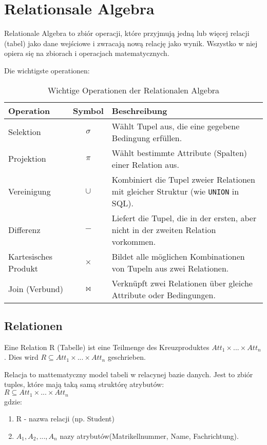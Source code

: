 
\section{Relationsale Algebra}

Relationale Algebra to zbiór operacji, które przyjmują jedną lub więcej relacji (tabel) jako dane wejściowe i zwracają nową relację jako wynik.
Wszystko w niej opiera się na zbiorach i operacjach matematycznych.


\vspace{0.5cm}
Die wichtigste operationen:
\begin{table}[H]
\centering
\caption{Wichtige Operationen der Relationalen Algebra}
\begin{tabularx}{\textwidth}{|l|c|X|}
\hline
\textbf{Operation} & \textbf{Symbol} & \textbf{Beschreibung} \\
\hline
Selektion & $\sigma$ & Wählt Tupel aus, die eine gegebene Bedingung erfüllen. \\
\hline
Projektion & $\pi$ & Wählt bestimmte Attribute (Spalten) einer Relation aus. \\
\hline
Vereinigung & $\cup$ & Kombiniert die Tupel zweier Relationen mit gleicher Struktur (wie \texttt{UNION} in SQL). \\
\hline
Differenz & $-$ & Liefert die Tupel, die in der ersten, aber nicht in der zweiten Relation vorkommen. \\
\hline
Kartesisches Produkt & $\times$ & Bildet alle möglichen Kombinationen von Tupeln aus zwei Relationen. \\
\hline
Join (Verbund) & $\bowtie$ & Verknüpft zwei Relationen über gleiche Attribute oder Bedingungen. \\
\hline
\end{tabularx}
\end{table}

\subsection{Relationen}
Eine Relation R (Tabelle) ist eine Teilmenge des Kreuzproduktes $Att_1 \times ... \times Att_n$. Dies wird $R \subseteq Att_1 \times ... \times Att_n$ geschrieben.

\begin{tcolorbox}[red, title={Hinweis}]
	Relacja to mattematyczny model tabeli w relacynej bazie danych. Jest to zbiór tuples, które mają taką samą struktórę atrybutów:\\
    $R \subseteq Att_1 \times ... \times Att_n$\\

    gdzie:
    \begin{enumerate}[label={}, leftmargin=15pt, itemsep=0pt, topsep=0pt]
        \item R - nazwa relacji (np. Student)
        \item $A_1, A_2, ..., A_n$ nazy atrybutów(Matrikellnummer, Name, Fachrichtung).
    \end{enumerate}
\end{tcolorbox}

